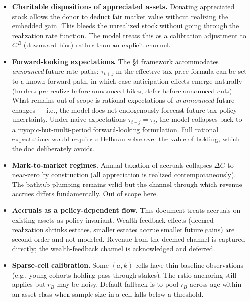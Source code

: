 \documentclass[11pt]{article}
\begin{document}
\begin{itemize}
  \item \textbf{Charitable dispositions of appreciated assets.} Donating appreciated
    stock allows the donor to deduct fair market value without realizing the
    embedded gain. This bleeds the unrealized stock without going through the
    realization rate function. The model treats this as a calibration
    adjustment to $G^B$ (downward bias) rather than an explicit channel.
\end{itemize}
\begin{itemize}
  \item \textbf{Forward-looking expectations.} The §4 framework accommodates
    \emph{announced} future rate paths: $\tau_{t+j}$ in the effective-tax-price
    formula can be set to a known forward path, in which case anticipation
    effects emerge naturally (holders pre-realize before announced hikes,
    defer before announced cuts). What remains out of scope is rational
    expectations of \emph{unannounced} future changes — i.e., the model does not
    endogenously forecast future tax-policy uncertainty. Under naive
    expectations $\tau_{t+j} = \tau_t$, the model collapses back to a
    myopic-but-multi-period forward-looking formulation. Full rational
    expectations would require a Bellman solve over the value of holding,
    which the doc deliberately avoids.
\end{itemize}
\begin{itemize}
  \item \textbf{Mark-to-market regimes.} Annual taxation of accruals collapses
    $\Delta G$ to near-zero by construction (all appreciation is realized
    contemporaneously). The bathtub plumbing remains valid but the channel
    through which revenue accrues differs fundamentally. Out of scope here.
\end{itemize}
\begin{itemize}
  \item \textbf{Accruals as a policy-dependent flow.} This document treats accruals on
    existing assets as policy-invariant. Wealth feedback effects (deemed
    realization shrinks estates, smaller estates accrue smaller future gains)
    are second-order and not modeled. Revenue from the deemed channel is
    captured directly; the wealth-feedback channel is acknowledged and
    deferred.
\end{itemize}
\begin{itemize}
  \item \textbf{Sparse-cell calibration.} Some $(a, k)$ cells have thin baseline
    observations (e.g., young cohorts holding pass-through stakes). The
    ratio anchoring still applies but $r_B$ may be noisy. Default fallback is
    to pool $r_B$ across age within an asset class when sample size in a cell
    falls below a threshold.
\end{itemize}
\end{document}
